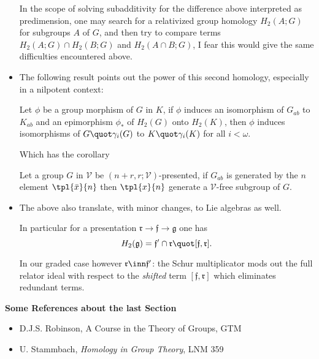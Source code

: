 \documentclass[a4paper,11pt,german,english]{report}
\begin{document}
\begin{itemize}
In the scope of solving subadditivity for the difference above interpreted as predimension,
one may search for a relativized group homology $H_{2}(A;G)$ for subgroups $A$ of $G$,
and then try to compare terms $H_{2}(A;G)\cap H_{2}(B;G)$ and $H_{2}(A\cap B;G)$,
I fear this would give the same difficulties encountered above.

\item[]The following result points out the power of this second homology, especially in a
nilpotent context:
\begin{teo*}
Let $\phi$ be a group morphism of $G$ in $K$, if $\phi$
induces an isomorphism of $G_{ab}$ to $K_{ab}$ and an epimorphism
$\phi_{*}$ of $H_{2}(G)$ onto $H_{2}(K)$, then $\phi$ induces
isomorphisms of $G\quot\gamma_{i}(G)$ to $K\quot\gamma_{i}(K)$ for all
$i<\omega$.
\end{teo*}
Which has the corollary
\begin{teo*}
Let a group $G$ in $\mathcal{V}$ be $(n+r,r;\mathcal{V})$-presented, if $G_{ab}$
is generated by the $n$ element $\tpl{\bar x}{n}$ then $\tpl{x}{n}$ generate a $\mathcal{V}$-free subgroup of $G$.
\end{teo*}

\item[]The above also translate, with minor changes, to Lie algebras as well.

In particular for a presentation $\mathfrak{r}\to\mathfrak{f}\to\mathfrak{g}$ one has
$$H_{2}(\mathfrak{g})=\mathfrak{f}^{\prime}\cap\mathfrak{r}\quot[\mathfrak{f},
\mathfrak{r}].$$

In our graded case however $\mathfrak{r}\inn\mathfrak{f}^{\prime}$: the Schur multiplicator mods out the full relator ideal with respect to the {\em shifted} term
$[\mathfrak{f},\mathfrak{r}]$ which eliminates redundant terms.
\end{itemize}

\indent
{\bf Some References about the last Section}
\begin{itemize}
\item D.J.S. Robinson, {A Course in the Theory of Groups}, GTM	
\item U. Stammbach, {\em Homology in Group Theory}, LNM 359
\end{itemize}
\end{document}
